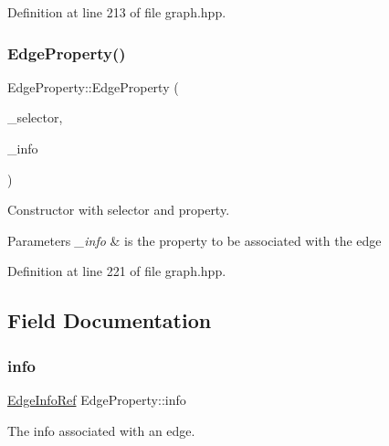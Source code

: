 Definition at line 213 of file graph.\+hpp.

\mbox{\label{structEdgeProperty_a1f64d67b4555577f68690e32edd54fd0}} 
\subsubsection{\texorpdfstring{Edge\+Property()}{EdgeProperty()}\hspace{0.1cm}{\footnotesize\ttfamily [3/3]}}
{\footnotesize\ttfamily Edge\+Property\+::\+Edge\+Property (\begin{DoxyParamCaption}\item[{const int}]{\+\_\+selector,  }\item[{\hyperlink{edge__info_8hpp_a65ddc964b1738667fc720f0de33aeef9}{Edge\+Info\+Ref}}]{\+\_\+info }\end{DoxyParamCaption})\hspace{0.3cm}{\ttfamily [inline]}}



Constructor with selector and property. 


\begin{DoxyParams}{Parameters}
{\em \+\_\+info} & is the property to be associated with the edge \\
\hline
\end{DoxyParams}


Definition at line 221 of file graph.\+hpp.



\subsection{Field Documentation}
\mbox{\label{structEdgeProperty_aac4ebbbcb528a3e84e81b55abc742a9e}} 
\subsubsection{\texorpdfstring{info}{info}}
{\footnotesize\ttfamily \hyperlink{edge__info_8hpp_a65ddc964b1738667fc720f0de33aeef9}{Edge\+Info\+Ref} Edge\+Property\+::info}



The info associated with an edge. 



